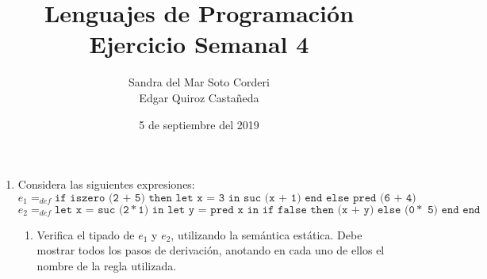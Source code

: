 \documentclass{article}
\begin{document}
    \title{
        Lenguajes de Programación \\
        Ejercicio Semanal 4
    }

    \author{
        Sandra del Mar Soto Corderi \\
        Edgar Quiroz Castañeda
    }

    \date{
        5 de septiembre del 2019
    }
    
    \maketitle

    \begin{enumerate}
        \item {
            Considera las siguientes expresiones:\\
                            
            	$e_1 =_{def} \texttt{if iszero (2 + 5) then let x = 3 in suc (x + 1) end else pred (6 + 4)}$\\
            	
            	$e_2 =_{def} \texttt{let x = suc (2} \ast \texttt{1) in let y = pred x in if false then (x + y) else (0} \ast \texttt{ 5) end end}$\\
            
            \begin{enumerate}
            	\item {
            	Verifica el tipado de $e_1$ y $e_2$, utilizando la semántica estática. Debe mostrar todos los pasos de derivación,        	anotando en cada uno de ellos el nombre de la regla utilizada.\\
            	
}
\end{enumerate}}
\end{enumerate}
\end{document}
